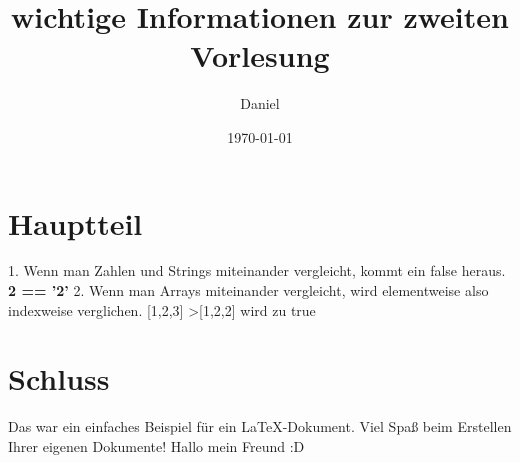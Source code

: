 \documentclass{article}
\begin{document}
\title{\textbf{wichtige Informationen zur zweiten Vorlesung}}
\author{Daniel}
\date{\today}
\maketitle

\section{Hauptteil}

1. Wenn man Zahlen und Strings miteinander vergleicht, kommt ein false heraus.
\textbf{2 == '2'} 
2. Wenn man Arrays miteinander vergleicht, wird elementweise also indexweise verglichen.
[1,2,3] \textgreater [1,2,2] wird zu true


\section{Schluss}
Das war ein einfaches Beispiel für ein LaTeX-Dokument. Viel Spaß beim Erstellen Ihrer eigenen Dokumente!
Hallo mein Freund :D
\end{document}

